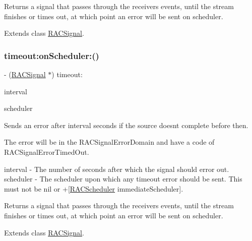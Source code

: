 Returns a signal that passes through the receiver\textquotesingle{}s events, until the stream finishes or times out, at which point an error will be sent on {\ttfamily scheduler}. 

Extends class \mbox{\hyperlink{interface_r_a_c_signal_a8c5f03f4cc8a132e91a985f3d5ccebc0}{R\+A\+C\+Signal}}.

\mbox{\label{category_r_a_c_signal_07_operations_08_a8c5f03f4cc8a132e91a985f3d5ccebc0}} 
\subsubsection{\texorpdfstring{timeout\+:on\+Scheduler\+:()}{timeout:onScheduler:()}\hspace{0.1cm}{\footnotesize\ttfamily [2/3]}}
{\footnotesize\ttfamily -\/ (\mbox{\hyperlink{interface_r_a_c_signal}{R\+A\+C\+Signal}} $\ast$) timeout\+: \begin{DoxyParamCaption}\item[{(N\+S\+Time\+Interval)}]{interval }\item[{onScheduler:(\mbox{\hyperlink{interface_r_a_c_scheduler}{R\+A\+C\+Scheduler}} $\ast$)}]{scheduler }\end{DoxyParamCaption}}

Sends an error after {\ttfamily interval} seconds if the source doesn\textquotesingle{}t complete before then.

The error will be in the R\+A\+C\+Signal\+Error\+Domain and have a code of R\+A\+C\+Signal\+Error\+Timed\+Out.

interval -\/ The number of seconds after which the signal should error out. scheduler -\/ The scheduler upon which any timeout error should be sent. This must not be nil or +\mbox{[}\mbox{\hyperlink{interface_r_a_c_scheduler}{R\+A\+C\+Scheduler}} immediate\+Scheduler\mbox{]}.

Returns a signal that passes through the receiver\textquotesingle{}s events, until the stream finishes or times out, at which point an error will be sent on {\ttfamily scheduler}. 

Extends class \mbox{\hyperlink{interface_r_a_c_signal_a8c5f03f4cc8a132e91a985f3d5ccebc0}{R\+A\+C\+Signal}}.

